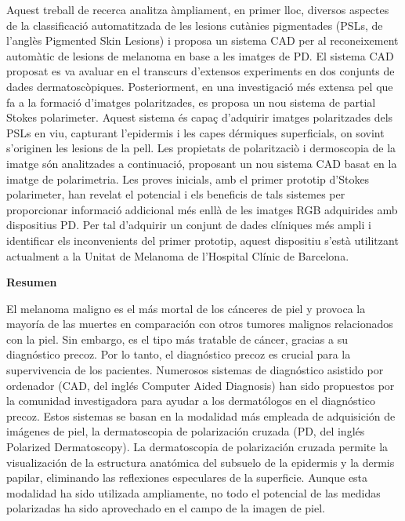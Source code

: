 Aquest treball de recerca analitza \`ampliament, en primer lloc, diversos aspectes de la classificaci\'o automatitzada de les lesions cut\`anies pigmentades (PSLs, de l'angl\`es Pigmented Skin Lesions) i proposa un sistema CAD per al reconeixement autom\`atic de lesions de melanoma en base a les imatges de PD.
El sistema CAD proposat es va avaluar en el transcurs d'extensos experiments en dos conjunts de dades dermatosc\`opiques. Posteriorment, en una investigaci\'o m\'es extensa pel que fa a la formaci\'o d'imatges polaritzades, es proposa un nou sistema de partial Stokes polarimeter.
Aquest sistema \'es capa\c{c} d'adquirir imatges polaritzades dels PSLs en viu, capturant l'epidermis i les capes d\'ermiques superficials, on sovint s'originen les lesions de la pell.
Les propietats de polaritzaci\`o i dermoscopia de la imatge s\'on analitzades a continuaci\'o, proposant un nou sistema CAD basat en la imatge de polarimetria.
Les proves inicials, amb el primer prototip d'Stokes polarimeter, han revelat el potencial i els beneficis de tals sistemes per proporcionar informaci\'o addicional m\'es enll\`a de les imatges RGB adquirides amb dispositius PD.
Per tal d'adquirir un conjunt de dades cl\'iniques m\'es ampli i identificar els inconvenients del primer prototip, aquest dispositiu s'est\`a utilitzant actualment a la Unitat de Melanoma de l'Hospital Cl\'inic de Barcelona.
\clearpage

\begin{center}\textbf{Resumen}\\\end{center}
El melanoma maligno es el m\'as mortal de los c\'anceres de piel y provoca la mayor\'ia de las muertes en comparaci\'on con otros tumores malignos relacionados con la piel.
Sin embargo, es el tipo m\'as tratable de c\'ancer, gracias a su diagn\'ostico precoz.
Por lo tanto, el diagn\'ostico precoz es crucial para la supervivencia de los pacientes.
Numerosos sistemas de diagn\'ostico asistido por ordenador (CAD, del ingl\'es Computer Aided Diagnosis) han sido propuestos por la comunidad investigadora para ayudar a los dermat\'ologos en el diagn\'ostico precoz.
Estos sistemas se basan en la modalidad m\'as empleada de adquisici\'on de im\'agenes de piel, la dermatoscopia de polarizaci\'on cruzada (PD, del ingl\'es Polarized Dermatoscopy).
La dermatoscopia de polarizaci\'on cruzada permite la visualizaci\'on de la estructura anat\'omica del subsuelo de la epidermis y la dermis papilar, eliminando las reflexiones especulares de la superficie.
Aunque esta modalidad ha sido utilizada ampliamente, no todo el potencial de las medidas polarizadas ha sido aprovechado en el campo de la imagen de piel.

